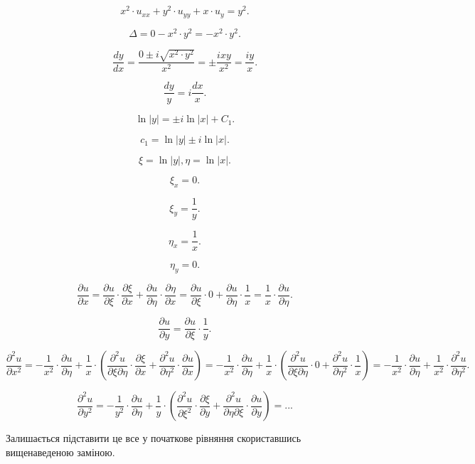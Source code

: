 \[ x^2 \cdot u_{xx} + y^2 \cdot u_{yy} + x \cdot u_y = y^2. \]

\[ \Delta = 0 - x^2 \cdot y^2 = - x^2 \cdot y^2. \]

\[ \dfrac{d y}{d x} = \dfrac{0 \pm i \sqrt{x^2 \cdot y^2}}{x^2} = \pm \dfrac{i x y}{x^2} = \dfrac{i y}{x}. \]

\[ \dfrac{d y}{y} = i \dfrac{d x}{x}. \]

\[ \ln |y| = \pm i \ln |x| + C_1. \]

\[ c_1 = \ln |y| \pm i \ln |x|. \]

\[ \xi = \ln |y|, \eta = \ln |x|. \]

\[ \xi_x = 0. \]

\[ \xi_y = \dfrac 1 y. \]

\[ \eta_x = \dfrac 1 x. \]

\[ \eta_y = 0. \]

\[ \dfrac{\partial u}{\partial x} = \dfrac{\partial u}{\partial \xi} \cdot \dfrac{\partial \xi}{\partial x} + \dfrac{\partial u}{\partial \eta} \cdot \dfrac{\partial \eta}{\partial x} = \dfrac{\partial u}{\partial \xi}  \cdot 0 + \dfrac{\partial u}{\partial \eta} \cdot \dfrac 1 x = \dfrac 1 x \cdot \dfrac{\partial u}{\partial \eta}. \]

\[ \dfrac{\partial u}{\partial y} = \dfrac{\partial u}{\partial \xi} \cdot \dfrac 1 y. \]

\[ \dfrac{\partial^2 u}{\partial x^2} = - \dfrac 1 {x^2} \cdot \dfrac{\partial u}{\partial \eta} + \dfrac 1 x \cdot \left( \dfrac{\partial^2 u}{\partial \xi \partial \eta} \cdot \dfrac{\partial \xi}{\partial x} + \dfrac{\partial^2 u}{\partial \eta^2} \cdot \dfrac{\partial u}{\partial x} \right) = - \dfrac 1 {x^2} \cdot \dfrac{\partial u}{\partial \eta} + \dfrac 1 x \cdot \left( \dfrac{\partial^2 u}{\partial \xi \partial \eta} \cdot 0 + \dfrac{\partial^2 u}{\partial \eta^2} \cdot \dfrac 1 x \right) = - \dfrac 1 {x^2} \cdot \dfrac{\partial u}{\partial \eta} + \dfrac 1 {x^2} \cdot \dfrac{\partial^2 u}{\partial \eta^2}. \]

\[ \dfrac{\partial^2 u}{\partial y^2} = - \dfrac 1 {y^2} \cdot \dfrac{\partial u}{\partial \eta} + \dfrac 1 y \cdot \left( \dfrac{\partial^2 u}{\partial \xi^2} \cdot \dfrac{\partial \xi}{\partial y} + \dfrac{\partial^2 u}{\partial \eta \partial \xi} \cdot \dfrac{\partial u}{\partial y} \right) = ... \]

Залишається підставити це все у початкове рівняння скориставшись вищенаведеною заміною.



